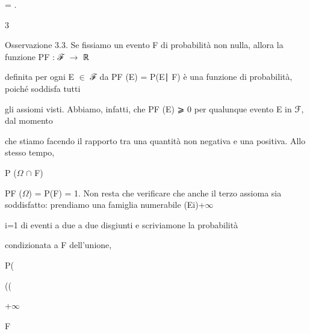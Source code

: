 \documentclass[a4paper,portrait,12pt]{article}
\begin{document}
= .


3





\begin{flushleft}
Osservazione 3.3. Se fissiamo un evento F di probabilit\`{a} non nulla, allora la funzione PF : ℱ $\rightarrow$ ℝ
\end{flushleft}


\begin{flushleft}
definita per ogni E $\in$ ℱ da PF (E) = P(E∣ F) \`{e} una funzione di probabilit\`{a}, poich\'{e} soddisfa tutti
\end{flushleft}


\begin{flushleft}
gli assiomi visti. Abbiamo, infatti, che PF (E) ⩾ 0 per qualunque evento E in ℱ, dal momento
\end{flushleft}


\begin{flushleft}
che stiamo facendo il rapporto tra una quantit\`{a} non negativa e una positiva. Allo stesso tempo,
\end{flushleft}


\begin{flushleft}
P ($\Omega$ $\cap$ F)
\end{flushleft}


\begin{flushleft}
PF ($\Omega$) = P(F) = 1. Non resta che verificare che anche il terzo assioma sia soddisfatto: prendiamo una famiglia numerabile (Ei)+$\infty$
\end{flushleft}


\begin{flushleft}
i=1 di eventi a due a due disgiunti e scriviamone la probabilit\`{a}
\end{flushleft}


\begin{flushleft}
condizionata a F dell'unione,
\end{flushleft}


\begin{flushleft}
P(
\end{flushleft}


((





+$\infty$





\begin{flushleft}
F
\end{flushleft}
\end{document}
